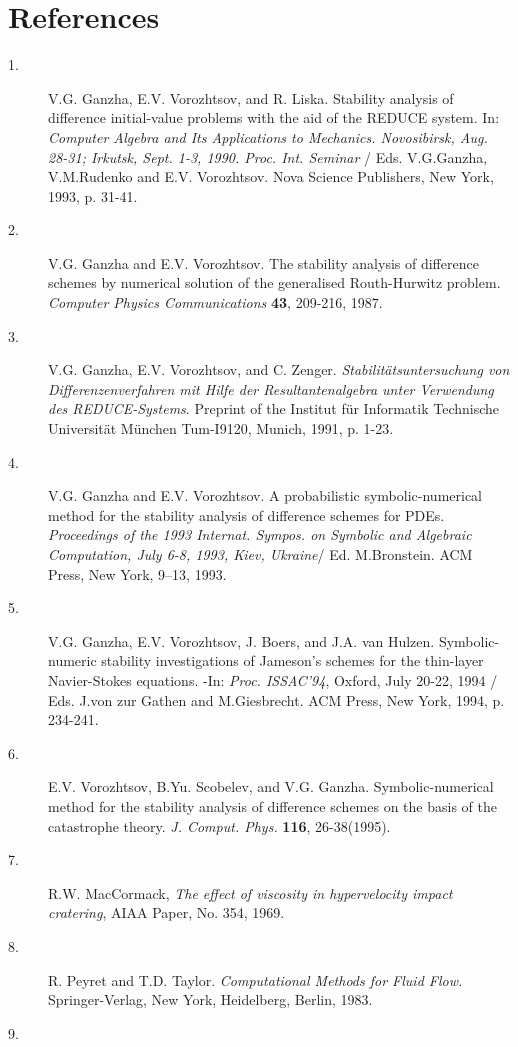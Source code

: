 \section*{References}
\begin{description}
\item[ 1.]
V.G. Ganzha, E.V. Vorozhtsov, and R. Liska. Stability analysis of difference
initial-value problems with the aid of the REDUCE system. In: {\em Computer
Algebra and Its Applications to Mechanics. Novosibirsk, Aug. 28-31; Irkutsk,
Sept. 1-3, 1990. Proc. Int. Seminar} / Eds. V.G.Ganzha, V.M.Rudenko and
E.V. Vorozhtsov. Nova Science Publishers, New York, 1993, p. 31-41.
\item[ 2.]
V.G. Ganzha and E.V. Vorozhtsov. The stability analysis of difference schemes
by numerical solution of the generalised Routh-Hurwitz problem. {\em Computer
Physics Communications} {\bf 43}, 209-216, 1987.
\item[ 3.]
V.G. Ganzha, E.V. Vorozhtsov, and C. Zenger. {\em Stabilit\"{a}tsuntersuchung
von Differenzenverfahren mit Hilfe der Resultantenalgebra unter Verwendung
des REDUCE-Systems}. Preprint of the Institut f\"{u}r Informatik Technische
Universit\"{a}t M\"{u}nchen Tum-I9120, Munich, 1991, p. 1-23.
\item[ 4.]
V.G. Ganzha and  E.V. Vorozhtsov. A probabilistic symbolic-numerical method for
    the stability analysis of difference schemes for PDEs. {\em Proceedings
    of the 1993 Internat. Sympos. on Symbolic and Algebraic Computation,
    July 6-8, 1993, Kiev, Ukraine}/ Ed. M.Bronstein. ACM Press, New York,
    9--13, 1993.
\item[ 5.]
V.G. Ganzha, E.V. Vorozhtsov, J. Boers, and J.A. van Hulzen. Symbolic-numeric
stability investigations of Jameson's schemes for the thin-layer
Navier-Stokes equations. -In: {\em Proc. ISSAC'94}, Oxford, July 20-22, 1994 /
Eds. J.von zur Gathen and M.Giesbrecht. ACM Press, New York, 1994, p. 234-241.
\item[ 6.]
E.V. Vorozhtsov, B.Yu. Scobelev, and V.G. Ganzha.
Symbolic-numerical method for the stability analysis of difference schemes on
the basis of the catastrophe theory. {\em J. Comput. Phys.} {\bf 116},
26-38(1995).
\item[ 7.]
R.W. MacCormack, {\em The effect of viscosity in hypervelocity impact
cratering}, AIAA Paper, No. 354, 1969.
\item[ 8.]
R. Peyret and T.D. Taylor. {\em Computational Methods for Fluid Flow.}
Spring\-er-Verlag, New York, Heidelberg, Berlin, 1983.
\item[ 9.]

\end{description}
